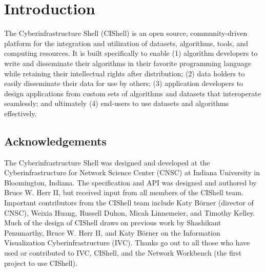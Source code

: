 %

\chapter{Introduction}

The Cyberinfrastructure Shell (CIShell) is an open source, community-driven
platform for the integration and utilization of datasets, algorithms, tools, and
computing resources. It is built specifically to enable (1) algorithm developers
to write and disseminate their algorithms in their favorite programming language
while retaining their intellectual rights after distribution; (2) data holders to
easily disseminate their data for use by others; (3) application developers to
design applications from custom sets of algorithms and datasets that interoperate
seamlessly; and ultimately (4) end-users to use datasets and algorithms
effectively.

\section{Acknowledgements}

The Cyberinfrastructure Shell was designed and developed at the
Cyberinfrastructure for Network Science Center (CNSC) at Indiana University in
Bloomington, Indiana. The specification and API was designed and authored by
Bruce W. Herr II, but received input from all members of the CIShell team.
Important contributors from the CIShell team include Katy B\"{o}rner (director of
CNSC), Weixia Huang, Russell Duhon, Micah Linnemeier, and Timothy Kelley. Much of
the design of CIShell draws on previous work by Shashikant Penumarthy, Bruce W.
Herr II, and Katy B\"{o}rner on the Information Visualization Cyberinfrastructure
(IVC). Thanks go out to all those who have used or contributed to IVC, CIShell,
and the Network Workbench (the first project to use CIShell).

